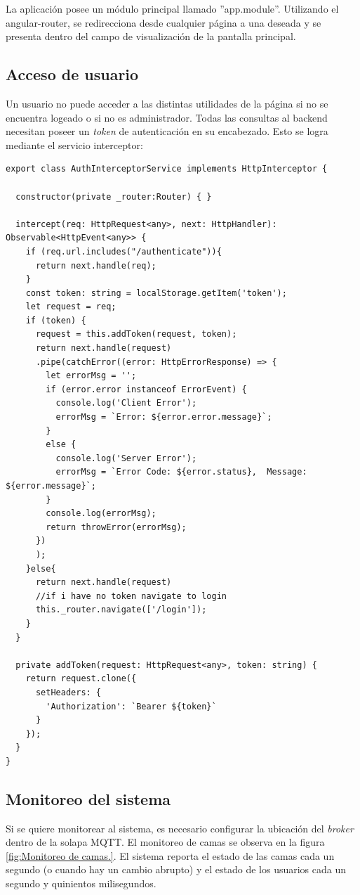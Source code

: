 La aplicación posee un módulo principal llamado ''app.module''. Utilizando el angular-router, se redirecciona desde cualquier página a una deseada y se presenta dentro del campo de visualización de la pantalla principal. 



\subsection{Acceso de usuario}

Un usuario no puede acceder a las distintas utilidades de la página si no se encuentra logeado o si no es administrador. Todas las consultas al backend necesitan poseer un \textit{token} de autenticación en su encabezado. Esto se logra mediante el servicio interceptor:


\begin{lstlisting}[label=cod:Inserción Token,caption=  Inserción de token.]
export class AuthInterceptorService implements HttpInterceptor {

  constructor(private _router:Router) { }

  intercept(req: HttpRequest<any>, next: HttpHandler): Observable<HttpEvent<any>> {
    if (req.url.includes("/authenticate")){
      return next.handle(req);
    }
    const token: string = localStorage.getItem('token');
    let request = req;
	if (token) {
      request = this.addToken(request, token);
      return next.handle(request)
      .pipe(catchError((error: HttpErrorResponse) => {
        let errorMsg = '';
        if (error.error instanceof ErrorEvent) {
          console.log('Client Error');
          errorMsg = `Error: ${error.error.message}`;
        }
        else {
          console.log('Server Error');
          errorMsg = `Error Code: ${error.status},  Message: ${error.message}`;
        }
        console.log(errorMsg);
        return throwError(errorMsg);
      })
      );
    }else{
      return next.handle(request)
      //if i have no token navigate to login
      this._router.navigate(['/login']);
    }    
  }

  private addToken(request: HttpRequest<any>, token: string) {
    return request.clone({
      setHeaders: {
        'Authorization': `Bearer ${token}`
      }
    });
  }
}

\end{lstlisting}

\pagebreak

\subsection{Monitoreo del sistema}
Si se quiere monitorear al sistema, es necesario configurar la ubicación del \textit{broker} dentro de la solapa MQTT. El monitoreo de camas se observa en la figura \ref{fig:Monitoreo de camas.}. El sistema reporta el estado de las camas cada un segundo (o cuando hay un cambio abrupto) y el estado de los usuarios cada un segundo y quinientos milisegundos.

